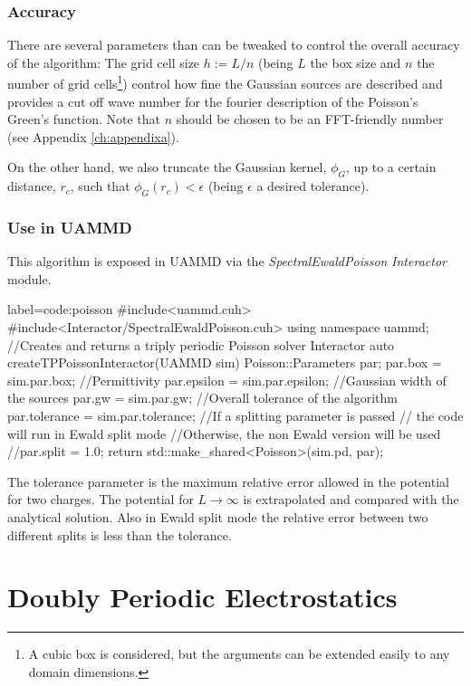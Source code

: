 \documentclass[ twoside,openright,titlepage,numbers=noenddot,%
headinclude,footinclude,cleardoublepage=empty,abstract=on,
BCOR=5mm,paper=a4,fontsize=11pt, dvipsnames
]{scrreprt}
\newcommand{\uammd}{\gls{UAMMD}\xspace}
\begin{document}
\subsection*{Accuracy}
There are several parameters than can be tweaked to control the overall accuracy of the algorithm:
The grid cell size $h:=L/n$ (being $L$ the box size and $n$ the number of grid cells\footnote{A cubic box is considered, but the arguments can be extended easily to any domain dimensions.}) control how fine the Gaussian sources are described and provides a cut off wave number for the fourier description of the Poisson's Green's function.
Note that $n$ should be chosen to be an \gls{FFT}-friendly number (see Appendix \ref{ch:appendixa}).

On the other hand, we also truncate the Gaussian kernel, $\phi_G$, up to a certain distance, $r_c$, such that $\phi_G(r_c)< \epsilon$ (being $\epsilon$ a desired tolerance).


\subsection*{Use in UAMMD}

This algorithm is exposed in \uammd via the \emph{SpectralEwaldPoisson} \emph{Interactor} module.

\begin{code2}{label=code:poisson}
#include<uammd.cuh>
#include<Interactor/SpectralEwaldPoisson.cuh>
using namespace uammd;
//Creates and returns a triply periodic Poisson solver Interactor
auto createTPPoissonInteractor(UAMMD sim){
  Poisson::Parameters par;
  par.box = sim.par.box;
  //Permittivity
  par.epsilon = sim.par.epsilon;
  //Gaussian width of the sources
  par.gw = sim.par.gw; 
  //Overall tolerance of the algorithm
  par.tolerance = sim.par.tolerance;
  //If a splitting parameter is passed
  // the code will run in Ewald split mode
  //Otherwise, the non Ewald version will be used
  //par.split = 1.0;
  return std::make_shared<Poisson>(sim.pd, par);
}
\end{code2}
The tolerance parameter is the maximum relative error allowed in the potential for two charges. The potential for $L\rightarrow\infty$ is extrapolated and compared with the analytical solution. Also in Ewald split mode the relative error between two different splits is less than the tolerance.

\chapter{Doubly Periodic Electrostatics}\label{ch:dppoisson}
\newcommand{\botl}{{0}}
\newcommand{\topl}{{H}}
\end{document}
